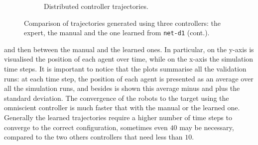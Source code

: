 \begin{figure}
\begin{center}
\begin{subfigure}[h]{0.49\textwidth}
			\caption{Distributed controller trajectories.}
		\end{subfigure}
	\end{center}
	\caption[]{Comparison 
		of trajectories generated using three controllers: the expert, the manual and 
		the one learned from \texttt{net-d1} (cont.).}
	\label{fig:net-d1traj}
\end{figure}

\noindent
and then between the manual and the learned ones. In particular, on the y-axis is  
visualised the position of each agent over time, while on the x-axis the simulation 
time steps. It is important to notice that the plots summarise all the validation 
runs: at each time step, the position of each agent is presented as an average over 
all the simulation runs, and besides is shown this average minus and plus the 
standard deviation.
The convergence of the robots to the target using the omniscient controller is 
much faster that with the manual or the learned one. Generally the learned 
trajectories require a higher number of time steps to converge to the correct 
configuration, sometimes even $40$ may be necessary, compared to the two 
others controllers that need less than $10$.

